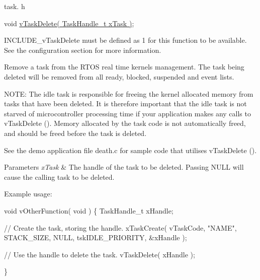 task. h 
\begin{DoxyPre}void \hyperlink{externals_2freertos_2include_2task_8h_a27ff4ebce26565bef136bda84201ff80}{vTaskDelete( TaskHandle\_t xTask )};\end{DoxyPre}


I\+N\+C\+L\+U\+D\+E\+\_\+v\+Task\+Delete must be defined as 1 for this function to be available. See the configuration section for more information.

Remove a task from the R\+T\+OS real time kernel\textquotesingle{}s management. The task being deleted will be removed from all ready, blocked, suspended and event lists.

N\+O\+TE\+: The idle task is responsible for freeing the kernel allocated memory from tasks that have been deleted. It is therefore important that the idle task is not starved of microcontroller processing time if your application makes any calls to v\+Task\+Delete (). Memory allocated by the task code is not automatically freed, and should be freed before the task is deleted.

See the demo application file death.\+c for sample code that utilises v\+Task\+Delete ().


\begin{DoxyParams}{Parameters}
{\em x\+Task} & The handle of the task to be deleted. Passing N\+U\+LL will cause the calling task to be deleted.\\
\hline
\end{DoxyParams}
Example usage\+: 
\begin{DoxyPre}
void vOtherFunction( void )
\{
TaskHandle\_t xHandle;
\begin{DoxyVerb}// Create the task, storing the handle.
xTaskCreate( vTaskCode, "NAME", STACK_SIZE, NULL, tskIDLE_PRIORITY, &xHandle );

// Use the handle to delete the task.
vTaskDelete( xHandle );
\end{DoxyVerb}

\}
  \end{DoxyPre}
 